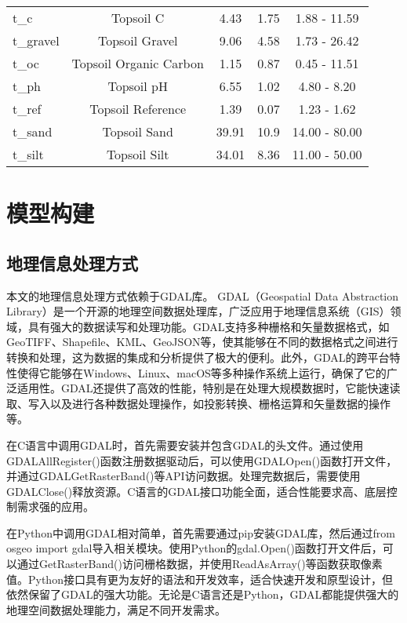 \documentclass[AutoFakeBold]{LZUThesis-PgD&PhD}
\begin{document}
\begin{longtable}[H]{lcccc}
	   t\_c & Topsoil C & 4.43 & 1.75 & 1.88 - 11.59 \\
	   t\_gravel & Topsoil Gravel & 9.06 & 4.58 & 1.73 - 26.42 \\
	   t\_oc & Topsoil Organic Carbon & 1.15 & 0.87 & 0.45 - 11.51 \\
	   t\_ph & Topsoil pH & 6.55 & 1.02 & 4.80 - 8.20 \\
	   t\_ref & Topsoil Reference & 1.39 & 0.07 & 1.23 - 1.62 \\
	   t\_sand & Topsoil Sand & 39.91 & 10.9 & 14.00 - 80.00 \\
	   t\_silt & Topsoil Silt & 34.01 & 8.36 & 11.00 - 50.00 \\
   \end{longtable}
   
\chapter{模型构建}

\section{地理信息处理方式}

本文的地理信息处理方式依赖于GDAL库。
GDAL（Geospatial Data Abstraction Library）是一个开源的地理空间数据处理库，广泛应用于地理信息系统（GIS）领域，具有强大的数据读写和处理功能。GDAL支持多种栅格和矢量数据格式，如GeoTIFF、Shapefile、KML、GeoJSON等，使其能够在不同的数据格式之间进行转换和处理，这为数据的集成和分析提供了极大的便利。此外，GDAL的跨平台特性使得它能够在Windows、Linux、macOS等多种操作系统上运行，确保了它的广泛适用性。GDAL还提供了高效的性能，特别是在处理大规模数据时，它能快速读取、写入以及进行各种数据处理操作，如投影转换、栅格运算和矢量数据的操作等。

在C语言中调用GDAL时，首先需要安装并包含GDAL的头文件。通过使用GDALAllRegister()函数注册数据驱动后，可以使用GDALOpen()函数打开文件，并通过GDALGetRasterBand()等API访问数据。处理完数据后，需要使用GDALClose()释放资源。C语言的GDAL接口功能全面，适合性能要求高、底层控制需求强的应用。

在Python中调用GDAL相对简单，首先需要通过pip安装GDAL库，然后通过from osgeo import gdal导入相关模块。使用Python的gdal.Open()函数打开文件后，可以通过GetRasterBand()访问栅格数据，并使用ReadAsArray()等函数获取像素值。Python接口具有更为友好的语法和开发效率，适合快速开发和原型设计，但依然保留了GDAL的强大功能。无论是C语言还是Python，GDAL都能提供强大的地理空间数据处理能力，满足不同开发需求。
\end{document}
